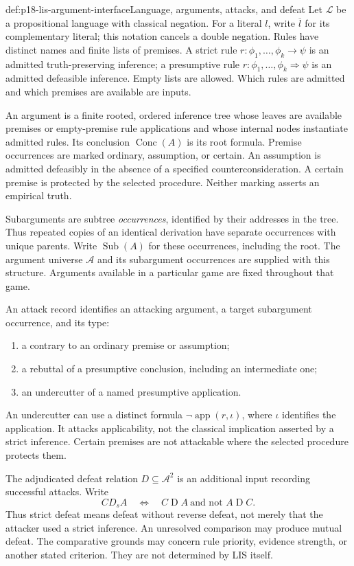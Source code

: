 \begin{hbdefinition}{def:p18-lis-argument-interface}{Language, arguments, attacks, and defeat}
Let \(\mathcal L\) be a propositional language with classical negation.
For a literal \(l\), write \(\overline l\) for its complementary
literal; this notation cancels a double negation.
Rules have distinct names and finite lists of premises.
A strict rule \(r:\phi_1,\ldots,\phi_k\to\psi\) is an admitted
truth-preserving inference; a presumptive rule
\(r:\phi_1,\ldots,\phi_k\Rightarrow\psi\) is an admitted defeasible
inference. Empty lists are allowed.
Which rules are admitted and which premises are available are inputs.

An argument is a finite rooted, ordered inference tree whose leaves
are available premises or empty-premise rule applications and whose
internal nodes instantiate admitted rules. Its conclusion
\(\operatorname{Conc}(A)\) is its root formula.
Premise occurrences are marked ordinary, assumption, or certain.
An assumption is admitted defeasibly in the absence of a specified
counterconsideration. A certain premise is protected by the selected
procedure. Neither marking asserts an empirical truth.

Subarguments are subtree \emph{occurrences}, identified by their
addresses in the tree. Thus repeated copies of an identical derivation
have separate occurrences with unique parents.
Write \(\operatorname{Sub}(A)\) for these occurrences, including the root.
The argument universe \(\mathcal A\) and its subargument occurrences
are supplied with this structure. Arguments available in a particular
game are fixed throughout that game.

An attack record identifies an attacking argument, a target
subargument occurrence, and its type:
\begin{enumerate}
\item a contrary to an ordinary premise or assumption;
\item a rebuttal of a presumptive conclusion, including an intermediate
one;
\item an undercutter of a named presumptive application.
\end{enumerate}
An undercutter can use a distinct formula
\(\neg\operatorname{app}(r,\iota)\), where \(\iota\) identifies the
application. It attacks applicability, not the classical implication
asserted by a strict inference.
Certain premises are not attackable where the selected procedure
protects them.

The adjudicated defeat relation \(D\subseteq\mathcal A^2\) is an
additional input recording successful attacks. Write
\[
C\mathrel{D_s}A\quad\Longleftrightarrow\quad
C\mathrel D A\ \text{and not }A\mathrel D C .
\]
Thus strict defeat means defeat without reverse defeat, not merely
that the attacker used a strict inference.
An unresolved comparison may produce mutual defeat.
The comparative grounds may concern rule priority, evidence strength,
or another stated criterion. They are not determined by LIS itself.


\end{hbdefinition}
